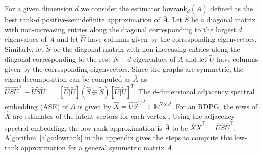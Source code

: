 \documentclass[journal,twoside,web]{ieeecolor}
\renewcommand{\Re}{\mathbb{R}}
\begin{document}



For a given dimension $d$ we consider the estimator $\mathrm{lowrank}_d(\bar{A})$ defined as the best rank-$d$ positive-semidefinite approximation of $\bar{A}$.
Let $\hat{S}$ be a diagonal matrix with non-increasing entries along the diagonal corresponding to the largest $d$ eigenvalues of $\bar{A}$ and let $\hat{U}$ have columns given by the corresponding eigenvectors. Similarly, let $\tilde{S}$ be the diagonal matrix with non-increasing entries along the diagonal corresponding to the rest $N - d$ eigenvalues of $\bar{A}$ and let $\tilde{U}$ have columns given by the corresponding eigenvectors.
Since the graphs are symmetric, the eigen-decomposition can be computed as $\bar{A}$ as $\hat{U} \hat{S} \hat{U}^{\top} + \tilde{U}\tilde{S}\tilde{U}^{\top}=[\hat{U}|\tilde{U}] (\hat{S}\oplus \tilde{S}) [\hat{U}|\tilde{U}]^T$.
The $d$-dimensional adjacency spectral embedding (ASE) of $\bar{A}$ is given by $\hat{X}=\hat{U} \hat{S}^{1/2}\in \Re^{N \times d}$.
For an RDPG, the rows of $\hat{X}$ are estimates of the latent vectors for each vertex \cite{sussman2014consistent}.
Using the adjacency spectral embedding, the low-rank approximation is $\bar{A}$ to be $\hat{X} \hat{X}^{\top}=\hat{U}\hat{S}\hat{U}^{\top}$.
Algorithm~\ref{algo:lowrank} in the appendix gives the steps to compute this low-rank approximation for a general symmetric matrix $A$.
\end{document}
